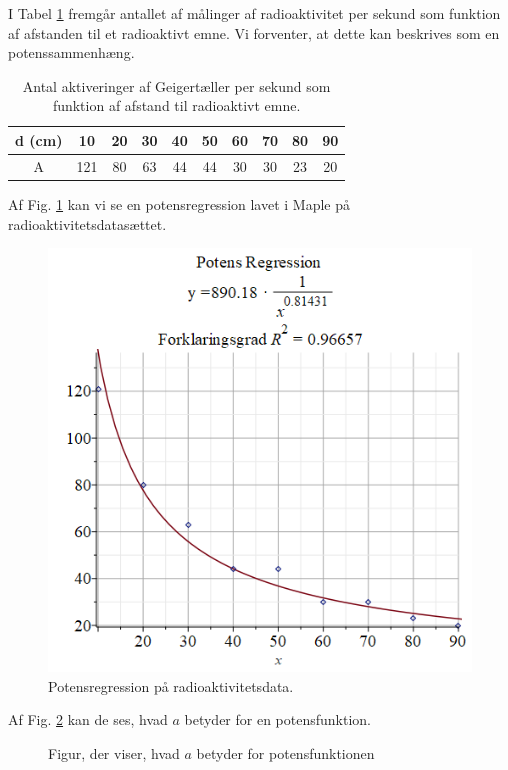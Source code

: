 \begin{exa}\label{exa:radio}
I Tabel \ref{tab:radio} fremgår antallet af målinger af radioaktivitet per sekund som funktion af afstanden til et radioaktivt emne. Vi forventer, at dette kan beskrives som en potenssammenhæng. 
\begin{table}[H]
\center
\begin{tabular}{c|c|c|c|c|c|c|c|c|c}
d (cm) & 10 & 20 & 30 & 40 & 50 & 60 & 70 & 80 & 90\\ \hline
A & 121 & 80 & 63 & 44 & 44 & 30 & 30 & 23 & 20 
\end{tabular}
\caption{Antal aktiveringer af Geigertæller per sekund som funktion af afstand til radioaktivt emne.}
\label{tab:radio}
\end{table}
Af Fig. \ref{fig:potensreg} kan vi se en potensregression lavet i Maple på radioaktivitetsdatasættet. 
\begin{figure}[H]
\includegraphics[width=\textwidth]{Billeder/potensreg.png}
\caption{Potensregression på radioaktivitetsdata.}
\label{fig:potensreg}
\end{figure}
\end{exa}
Af Fig. \ref{fig:potensfunk} kan de ses, hvad $a$ betyder for en potensfunktion.
\begin{figure}[H]
\centering
{}
\caption{Figur, der viser, hvad $a$ betyder for potensfunktionen}
\label{fig:potensfunk}
\end{figure}

